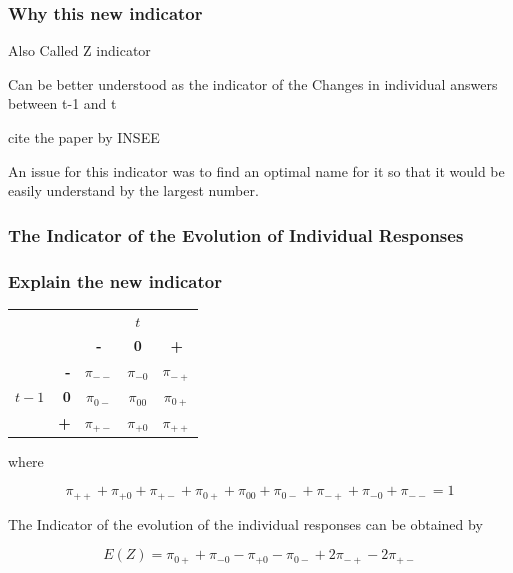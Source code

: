 \documentclass[12pt,a4paper,oneside]{book}
\begin{document}
 \subsubsection{Why this new indicator}

Also Called Z indicator

Can be better understood as the indicator of the Changes in individual answers between t-1 and t

cite the paper by INSEE %


 An issue for this indicator was to find an optimal name for it so that it would be easily understand by the largest number.
 
 

\subsubsection{The Indicator of the Evolution of Individual Responses}


\subsubsection{Explain the new indicator}

\begin{center}
\begin{tabular}{r | r | c c c | }
\multicolumn{1}{r}{} & \multicolumn{1}{r}{} &	\multicolumn{3}{c}{$t$} \\ \cline{3-5}
\multicolumn{1}{r}{} & 		& \textbf{-} & \textbf{0} & \textbf{+} \\ \cline{2-5}
		&    \textbf{-} & $\pi_{--}$	& $\pi_{-0}$	& $\pi_{-+}$ \\ 
$t-1$ & \textbf{0} & $\pi_{0-}$	& $\pi_{00}$	& $\pi_{0+}$	\\
		&    \textbf{+} & $\pi_{+-}$	& $\pi_{+0}$	& $\pi_{++}$ \\ \cline{2-5}
\end{tabular}    
\end{center}

where

\begin{equation}
\pi_{++} + \pi_{+0} + \pi_{+-} + \pi_{0+} + \pi_{00} + \pi_{0-} + \pi_{-+} + \pi_{-0} + \pi_{--} = 1
\end{equation}

The Indicator of the evolution of the individual responses can be obtained by

\begin{equation}
E(Z) = \pi_{0+} + \pi_{-0} - \pi_{+0} - \pi_{0-} +2\pi_{-+} -2\pi_{+-} 
\end{equation}
\end{document}
